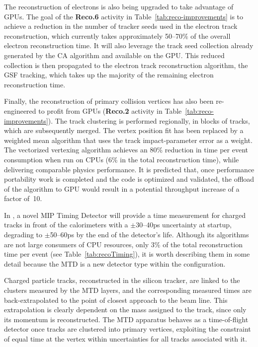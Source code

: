 The reconstruction of electrons is also being upgraded to take advantage of \glspl{GPU}. The goal of the \textbf{ Reco.6} activity in Table~\ref{tab:reco-improvements} is to achieve a reduction in the number of tracker seeds used in the electron track reconstruction, which currently takes approximately 50--70\% of the overall electron reconstruction time. It will also leverage the track seed collection already generated by the \gls{CA} algorithm and available on the \gls{GPU}. This reduced collection is then propagated to the electron track reconstruction algorithm, the \gls{GSF} tracking, which takes up the majority of the remaining electron reconstruction time. 

Finally, the reconstruction of primary collision vertices has also been re-engineered to profit from \glspl{GPU} (\textbf{Reco.2} activity in Table~\ref{tab:reco-improvements}). The track clustering is performed regionally, in blocks of tracks, which are subsequently merged. The vertex position fit has been replaced by a weighted mean algorithm that uses the track impact-parameter error as a weight.  The vectorized vertexing algorithm achieves an 80\% reduction in time per event consumption when run on \glspl{CPU} (6\% in the total reconstruction time), while delivering comparable physics performance. 
It is predicted that, once performance portability work is completed and the code is optimized and validated, the offload of the algorithm to \gls{GPU} would result in a potential throughput increase of a factor of~10. 

In \PhaseTwo, a novel \gls{MIP} Timing Detector will provide a time measurement for charged tracks in front of the calorimeters with a $\pm$30--40\unit{ps} uncertainty at startup, degrading to $\pm$50--60\unit{ps} by the end of the detector's life. 
Although its algorithms are not large consumers of \gls{CPU} resources, only 3\% of the total reconstruction time per event (see Table~\ref{tab:recoTiming}), it is worth describing them in some detail because the \gls{MTD} is a new detector type within the \PhaseTwo configuration. 

Charged particle tracks, reconstructed in the silicon tracker, are linked to the clusters measured by the \gls{MTD} layers, and the corresponding measured times are back-extrapolated to the point of closest approach to the beam line. This extrapolation is clearly dependent on the mass assigned to the track, since only its momentum is reconstructed. The \gls{MTD} apparatus behaves as a time-of-flight detector once tracks are clustered into primary vertices, exploiting the constraint of equal time at the vertex within uncertainties for all tracks associated with it.

